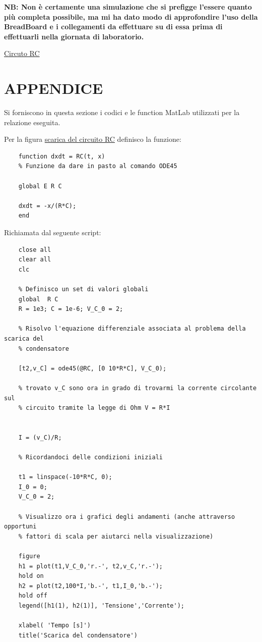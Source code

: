\documentclass[a4paper, 12pt, twoside]{report}
\begin{document}
{\begin{tiny}
\bfseries{NB:}
Non è certamente una simulazione che si prefigge l'essere quanto più completa possibile, ma mi ha dato modo di approfondire l'uso della BreadBoard e i collegamenti da effettuare su di essa prima di effettuarli nella giornata di laboratorio.

\centering
\href{https://www.tinkercad.com/things/k6fuBPthn0e?sharecode=06xSXa80c2SOSf8Q0XRtDYWuw-FRCAJIOp7TCuEwDis}{Circuto RC}
\end{tiny} \newpage

\section{APPENDICE} \mbox{} \newline
Si forniscono in questa sezione i codici e le function MatLab utilizzati per la relazione eseguita.


Per la figura \hyperref[fig:PLOTRC]{scarica del circuito RC} definisco la funzione:
\begin{verbatim}
	function dxdt = RC(t, x)
	% Funzione da dare in pasto al comando ODE45
	
	global E R C
	
	dxdt = -x/(R*C);
	end
\end{verbatim}
Richiamata dal seguente script:
\begin{verbatim}
	close all
	clear all
	clc
	
	% Definisco un set di valori globali
	global  R C
	R = 1e3; C = 1e-6; V_C_0 = 2;
	
	% Risolvo l'equazione differenziale associata al problema della scarica del
	% condensatore
	
	[t2,v_C] = ode45(@RC, [0 10*R*C], V_C_0);
	
	% trovato v_C sono ora in grado di trovarmi la corrente circolante sul
	% circuito tramite la legge di Ohm V = R*I
	
	
	I = (v_C)/R;
	
	% Ricordandoci delle condizioni iniziali 
	
	t1 = linspace(-10*R*C, 0);
	I_0 = 0;
	V_C_0 = 2;
	
	% Visualizzo ora i grafici degli andamenti (anche attraverso opportuni
	% fattori di scala per aiutarci nella visualizzazione)
	
	figure
	h1 = plot(t1,V_C_0,'r.-', t2,v_C,'r.-');
	hold on
	h2 = plot(t2,100*I,'b.-', t1,I_0,'b.-');
	hold off
	legend([h1(1), h2(1)], 'Tensione','Corrente');
	
	xlabel( 'Tempo [s]')
	title('Scarica del condensatore')
	

\end{verbatim}}
\end{document}
